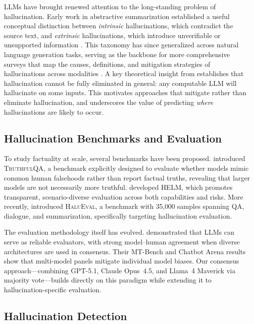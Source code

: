 \documentclass{article}
\begin{document}
LLMs have brought renewed attention to the long-standing problem of hallucination. Early work in abstractive summarization established a useful conceptual distinction between \textit{intrinsic} hallucinations, which contradict the source text, and \textit{extrinsic} hallucinations, which introduce unverifiable or unsupported information \citep{maynez2020faithfulness}. This taxonomy has since generalized across natural language generation tasks, serving as the backbone for more comprehensive surveys that map the causes, definitions, and mitigation strategies of hallucinations across modalities \citep{ji2023survey}. A key theoretical insight from \citet{xu2024hallucination} establishes that hallucination cannot be fully eliminated in general: any computable LLM will hallucinate on some inputs. This motivates approaches that mitigate rather than eliminate hallucination, and underscores the value of predicting \emph{where} hallucinations are likely to occur.

\subsection{Hallucination Benchmarks and Evaluation}

To study factuality at scale, several benchmarks have been proposed. \citet{lin2022truthfulqa} introduced \textsc{TruthfulQA}, a benchmark explicitly designed to evaluate whether models mimic common human falsehoods rather than report factual truths, revealing that larger models are not necessarily more truthful. \citet{liang2022helm} developed \textsc{HELM}, which promotes transparent, scenario-diverse evaluation across both capabilities and risks. More recently, \citet{li2023halueval} introduced \textsc{HaluEval}, a benchmark with 35,000 samples spanning QA, dialogue, and summarization, specifically targeting hallucination evaluation.

The evaluation methodology itself has evolved. \citet{zheng2023judging} demonstrated that LLMs can serve as reliable evaluators, with strong model--human agreement when diverse architectures are used in consensus. Their MT-Bench and Chatbot Arena results show that multi-model panels mitigate individual model biases. Our consensus approach---combining GPT-5.1, Claude Opus~4.5, and Llama~4 Maverick via majority vote---builds directly on this paradigm while extending it to hallucination-specific evaluation.

\subsection{Hallucination Detection}
\end{document}

